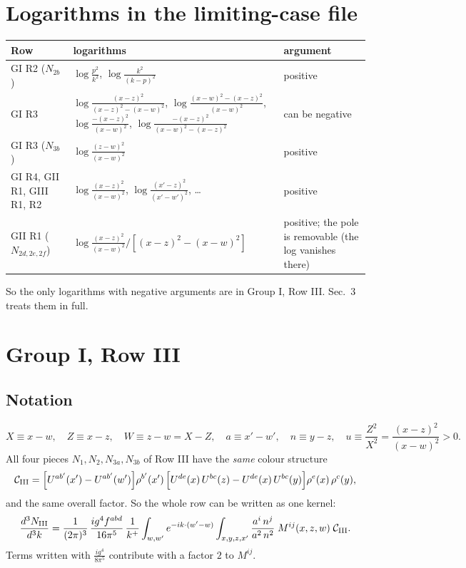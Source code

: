 \documentclass[10pt]{article}
\numberwithin{equation}{section}
\newcommand{\red}[1]{{\color{red}#1}}
\begin{document}
\section{Logarithms in the limiting-case file}
\begin{tabular}{p{}p{}p{}}
\toprule
Row & logarithms & argument\\\midrule
GI R2 ($N_{2b}$) & $\log\frac{p^{2}}{k^{2}}$, $\log\frac{k^{2}}{(k-p)^{2}}$ & positive\\
GI R3 & $\log\frac{(x-z)^{2}}{(x-z)^{2}-(x-w)^{2}}$, $\log\frac{(x-w)^{2}-(x-z)^{2}}{(x-w)^{2}}$, $\log\frac{-(x-z)^{2}}{(x-w)^{2}}$, $\log\frac{-(x-z)^{2}}{(x-w)^{2}-(x-z)^{2}}$ & \red{can be negative}\\
GI R3 ($N_{3b}$) & $\log\frac{(z-w)^{2}}{(x-w)^{2}}$ & positive\\
GI R4, GII R1, GIII R1, R2 & $\log\frac{(x-z)^{2}}{(x-w)^{2}}$, $\log\frac{(x'-z)^{2}}{(x'-w')^{2}}$, \dots & positive\\
GII R1 ($N_{2d,2e,2f}$) & $\log\frac{(x-z)^{2}}{(x-w)^{2}}\big/[(x-z)^{2}-(x-w)^{2}]$ & positive; the pole is removable (the log vanishes there)\\\bottomrule
\end{tabular}

\noindent So the only logarithms with negative arguments are in Group I, Row III. Sec.~3 treats them in full.

\section{Group I, Row III}
\subsection{Notation}
\begin{equation}
X\equiv x-w,\quad Z\equiv x-z,\quad W\equiv z-w=X-Z,\quad a\equiv x'-w',\quad n\equiv y-z,\quad u\equiv\frac{Z^{2}}{X^{2}}=\frac{(x-z)^{2}}{(x-w)^{2}}>0 .
\end{equation}
All four pieces $N_{1},N_{2},N_{3a},N_{3b}$ of Row III have the \emph{same} colour structure
\begin{equation}
\mathcal C_{\rm III}=\Big[U^{ab'}(x')-U^{ab'}(w')\Big]\rho^{b'}(x')\,\Big[U^{de}(x)\,U^{bc}(z)-U^{de}(x)\,U^{bc}(y)\Big]\rho^{e}(x)\,\rho^{c}(y),
\end{equation}
and the same overall factor. So the whole row can be written as one kernel:
\begin{equation}
\frac{d^{3}N_{\rm III}}{d^{3}k}=\frac{1}{(2\pi)^{3}}\,\frac{ig^{4}f^{abd}}{16\pi^{5}}\,\frac{1}{k^{+}}\int_{w,w'}e^{-ik\cdot(w'-w)}\int_{x,y,z,x'}\frac{a^{i}\,n^{j}}{a^{2}\,n^{2}}\;M^{ij}(x,z,w)\;\mathcal C_{\rm III}.
\label{eq:unit}
\end{equation}
Terms written with $\frac{ig^{4}}{8\pi^{5}}$ contribute with a factor $2$ to $M^{ij}$.
\end{document}
